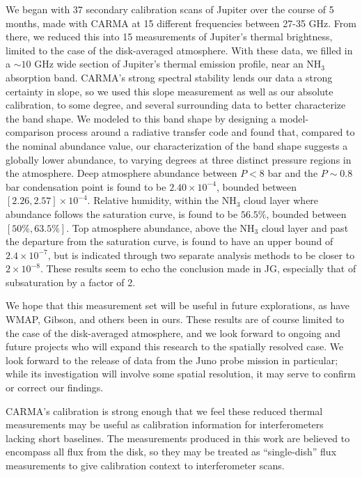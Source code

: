 \documentclass{article}
\newcommand{\e}[1]{\times 10^{#1}}
\begin{document}
	We began with 37 secondary calibration scans of Jupiter over the course of 5 months, made with CARMA at 15 different frequencies between 27-35 GHz.
	From there, we reduced this into 15 measurements of Jupiter's thermal brightness, limited to the case of the disk-averaged atmosphere.
	With these data, we filled in a $\sim 10$ GHz wide section of Jupiter's thermal emission profile, near an NH$_{3}$ absorption band.
	CARMA's strong spectral stability lends our data a strong certainty in slope, so we used this slope measurement as well as our absolute calibration, to some degree, and several surrounding data to better characterize the band shape.
	We modeled to this band shape by designing a model-comparison process around a radiative transfer code and found that, compared to the nominal abundance value, our characterization of the band shape suggests a globally lower abundance, to varying degrees at three distinct pressure regions in the atmosphere.
	Deep atmosphere abundance between $P < 8$ bar and the $P \sim 0.8$ bar condensation point is found to be $2.40\e{-4}$, bounded between $[2.26, 2.57] \e{-4}$.
	Relative humidity, within the NH$_{3}$ cloud layer where abundance follows the saturation curve, is found to be $56.5\%$, bounded between $[50\%, 63.5\%]$.
	Top atmosphere abundance, above the NH$_{3}$ cloud layer and past the departure from the saturation curve, is found to have an upper bound of $2.4\e{-7}$, but is indicated through two separate analysis methods to be closer to $2\e{-8}$.
	These results seem to echo the conclusion made in JG, especially that of subsaturation by a factor of 2.

	We hope that this measurement set will be useful in future explorations, as have WMAP, Gibson, and others been in ours.
	These results are of course limited to the case of the disk-averaged atmosphere, and we look forward to ongoing and future projects who will expand this research to the spatially resolved case.
	We look forward to the release of data from the Juno probe mission in particular; while its investigation will involve some spatial resolution, it may serve to confirm or correct our findings.

	CARMA's calibration is strong enough that we feel these reduced thermal measurements may be useful as calibration information for interferometers lacking short baselines.
	The measurements produced in this work are believed to encompass all flux from the disk, so they may be treated as ``single-dish'' flux measurements to give calibration context to interferometer scans.
\end{document}
